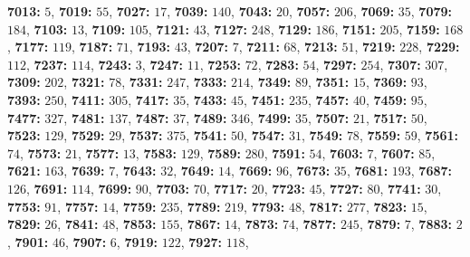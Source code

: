 \textsf{\bfseries 7013:} $5$, \textsf{\bfseries 7019:} $55$, \textsf{\bfseries 7027:} $17$, \textsf{\bfseries 7039:} $140$, \textsf{\bfseries 7043:} $20$, \textsf{\bfseries 7057:} $206$, \textsf{\bfseries 7069:} $35$, \textsf{\bfseries 7079:} $184$, \textsf{\bfseries 7103:} $13$, \textsf{\bfseries 7109:} $105$, \textsf{\bfseries 7121:} $43$, \textsf{\bfseries 7127:} $248$, \textsf{\bfseries 7129:} $186$, \textsf{\bfseries 7151:} $205$, \textsf{\bfseries 7159:} $168$, \textsf{\bfseries 7177:} $119$, \textsf{\bfseries 7187:} $71$, \textsf{\bfseries 7193:} $43$, \textsf{\bfseries 7207:} $7$, \textsf{\bfseries 7211:} $68$, \textsf{\bfseries 7213:} $51$, \textsf{\bfseries 7219:} $228$, \textsf{\bfseries 7229:} $112$, \textsf{\bfseries 7237:} $114$, \textsf{\bfseries 7243:} $3$, \textsf{\bfseries 7247:} $11$, \textsf{\bfseries 7253:} $72$, \textsf{\bfseries 7283:} $54$, \textsf{\bfseries 7297:} $254$, \textsf{\bfseries 7307:} $307$, \textsf{\bfseries 7309:} $202$, \textsf{\bfseries 7321:} $78$, \textsf{\bfseries 7331:} $247$, \textsf{\bfseries 7333:} $214$, \textsf{\bfseries 7349:} $89$, \textsf{\bfseries 7351:} $15$, \textsf{\bfseries 7369:} $93$, \textsf{\bfseries 7393:} $250$, \textsf{\bfseries 7411:} $305$, \textsf{\bfseries 7417:} $35$, \textsf{\bfseries 7433:} $45$, \textsf{\bfseries 7451:} $235$, \textsf{\bfseries 7457:} $40$, \textsf{\bfseries 7459:} $95$, \textsf{\bfseries 7477:} $327$, \textsf{\bfseries 7481:} $137$, \textsf{\bfseries 7487:} $37$, \textsf{\bfseries 7489:} $346$, \textsf{\bfseries 7499:} $35$, \textsf{\bfseries 7507:} $21$, \textsf{\bfseries 7517:} $50$, \textsf{\bfseries 7523:} $129$, \textsf{\bfseries 7529:} $29$, \textsf{\bfseries 7537:} $375$, \textsf{\bfseries 7541:} $50$, \textsf{\bfseries 7547:} $31$, \textsf{\bfseries 7549:} $78$, \textsf{\bfseries 7559:} $59$, \textsf{\bfseries 7561:} $74$, \textsf{\bfseries 7573:} $21$, \textsf{\bfseries 7577:} $13$, \textsf{\bfseries 7583:} $129$, \textsf{\bfseries 7589:} $280$, \textsf{\bfseries 7591:} $54$, \textsf{\bfseries 7603:} $7$, \textsf{\bfseries 7607:} $85$, \textsf{\bfseries 7621:} $163$, \textsf{\bfseries 7639:} $7$, \textsf{\bfseries 7643:} $32$, \textsf{\bfseries 7649:} $14$, \textsf{\bfseries 7669:} $96$, \textsf{\bfseries 7673:} $35$, \textsf{\bfseries 7681:} $193$, \textsf{\bfseries 7687:} $126$, \textsf{\bfseries 7691:} $114$, \textsf{\bfseries 7699:} $90$, \textsf{\bfseries 7703:} $70$, \textsf{\bfseries 7717:} $20$, \textsf{\bfseries 7723:} $45$, \textsf{\bfseries 7727:} $80$, \textsf{\bfseries 7741:} $30$, \textsf{\bfseries 7753:} $91$, \textsf{\bfseries 7757:} $14$, \textsf{\bfseries 7759:} $235$, \textsf{\bfseries 7789:} $219$, \textsf{\bfseries 7793:} $48$, \textsf{\bfseries 7817:} $277$, \textsf{\bfseries 7823:} $15$, \textsf{\bfseries 7829:} $26$, \textsf{\bfseries 7841:} $48$, \textsf{\bfseries 7853:} $155$, \textsf{\bfseries 7867:} $14$, \textsf{\bfseries 7873:} $74$, \textsf{\bfseries 7877:} $245$, \textsf{\bfseries 7879:} $7$, \textsf{\bfseries 7883:} $2$, \textsf{\bfseries 7901:} $46$, \textsf{\bfseries 7907:} $6$, \textsf{\bfseries 7919:} $122$, \textsf{\bfseries 7927:} $118$, 
